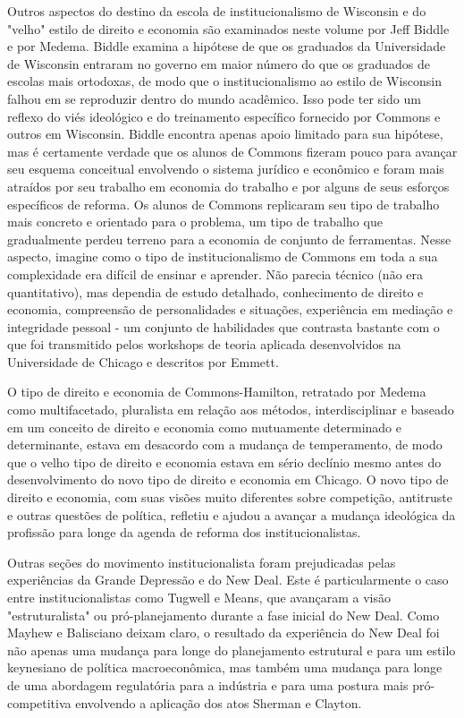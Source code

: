 \documentclass[12pt]{article}
\begin{document}
Outros aspectos do destino da escola de institucionalismo de Wisconsin e do "velho" estilo de direito e economia são examinados neste volume por Jeff Biddle e por Medema. Biddle examina a hipótese de que os graduados da Universidade de Wisconsin entraram no governo em maior número do que os graduados de escolas mais ortodoxas, de modo que o institucionalismo ao estilo de Wisconsin falhou em se reproduzir dentro do mundo acadêmico. Isso pode ter sido um reflexo do viés ideológico e do treinamento específico fornecido por Commons e outros em Wisconsin. Biddle encontra apenas apoio limitado para sua hipótese, mas é certamente verdade que os alunos de Commons fizeram pouco para avançar seu esquema conceitual envolvendo o sistema jurídico e econômico e foram mais atraídos por seu trabalho em economia do trabalho e por alguns de seus esforços específicos de reforma. Os alunos de Commons replicaram seu tipo de trabalho mais concreto e orientado para o problema, um tipo de trabalho que gradualmente perdeu terreno para a economia de conjunto de ferramentas. Nesse aspecto, imagine como o tipo de institucionalismo de Commons em toda a sua complexidade era difícil de ensinar e aprender. Não parecia técnico (não era quantitativo), mas dependia de estudo detalhado, conhecimento de direito e economia, compreensão de personalidades e situações, experiência em mediação e integridade pessoal - um conjunto de habilidades que contrasta bastante com o que foi transmitido pelos workshops de teoria aplicada desenvolvidos na Universidade de Chicago e descritos por Emmett.

O tipo de direito e economia de Commons-Hamilton, retratado por Medema como multifacetado, pluralista em relação aos métodos, interdisciplinar e baseado em um conceito de direito e economia como mutuamente determinado e determinante, estava em desacordo com a mudança de temperamento, de modo que o velho tipo de direito e economia estava em sério declínio mesmo antes do desenvolvimento do novo tipo de direito e economia em Chicago. O novo tipo de direito e economia, com suas visões muito diferentes sobre competição, antitruste e outras questões de política, refletiu e ajudou a avançar a mudança ideológica da profissão para longe da agenda de reforma dos institucionalistas.

Outras seções do movimento institucionalista foram prejudicadas pelas experiências da Grande Depressão e do New Deal. Este é particularmente o caso entre institucionalistas como Tugwell e Means, que avançaram a visão "estruturalista" ou pró-planejamento durante a fase inicial do New Deal. Como Mayhew e Balisciano deixam claro, o resultado da experiência do New Deal foi não apenas uma mudança para longe do planejamento estrutural e para um estilo keynesiano de política macroeconômica, mas também uma mudança para longe de uma abordagem regulatória para a indústria e para uma postura mais pró-competitiva envolvendo a aplicação dos atos Sherman e Clayton.
\end{document}
